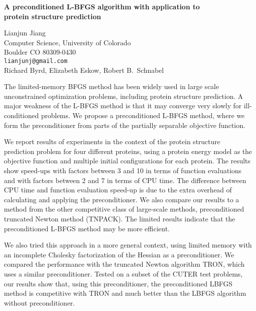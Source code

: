 \documentclass{report}
\begin{document}

\begin{center}
{\large
{\bf A preconditioned L-BFGS algorithm with application to \\
	protein structure prediction}}

	Lianjun Jiang \\
	Computer Science, University of Colorado \\
	Boulder CO 80309-0430 \\
	{\tt lianjunj@gmail.com} \\
	Richard Byrd, Elizabeth Eskow, Robert B.~Schnabel
\end{center}
The limited-memory BFGS method has been widely used in large
scale unconstrained optimization problems, including protein
structure prediction. A major weakness of the L-BFGS method
is that it may converge very slowly for ill-conditioned
problems. We propose a preconditioned L-BFGS method, where
we form the preconditioner from parts of the partially
separable objective function.

We report results of
experiments in the context of the protein structure
prediction problem for four different proteins, using a
protein energy model as the objective function and multiple
initial configurations for each protein. The results show
speed-ups with factors between 3 and 10 in terms of function
evaluations and with factors between 2 and 7 in terms of CPU
time. The difference between CPU time and function
evaluation speed-up is due to the extra overhead of
calculating and applying the preconditioner. We also compare
our results to a method from the other competitive class of
large-scale methods, preconditioned truncated Newton method
(TNPACK). The limited results indicate that the
preconditioned L-BFGS method may be more efficient.

We
also tried this approach in a more general context, using
limited memory with an incomplete Cholesky factorization of
the Hessian as a preconditioner. We compared the performance
with the truncated Newton algorithm TRON, which uses a
similar preconditioner. Tested on a subset of the CUTER test
problems, our results show that, using this preconditioner,
the preconditioned LBFGS method is competitive with TRON and
much better than the LBFGS algorithm without preconditioner.



\end{document}
